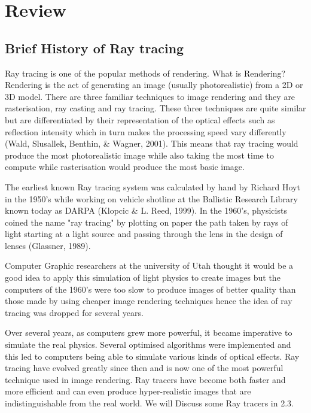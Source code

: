 \documentclass[a4paper]{article}
\begin{document}
	\section{Review}
	\subsection{Brief History of Ray tracing}
	
	\par Ray tracing is one of the popular methods of rendering. What is Rendering? Rendering is the act of generating an image (usually photorealistic) from a 2D or 3D model. There are three familiar techniques to image rendering and they are rasterisation, ray casting and ray tracing. These three techniques are quite similar but are differentiated by their representation of the optical effects such as reflection intensity which in turn makes the processing speed vary differently (Wald, Slusallek, Benthin, \& Wagner, 2001). This means that ray tracing would produce the most photorealistic image while also taking the most time to compute while rasterisation would produce the most basic image.\\
	
	\par The earliest known Ray tracing system was calculated by hand by Richard Hoyt in the 1950's while working on vehicle shotline at the Ballistic Research Library known today as DARPA (Klopcic \& L. Reed, 1999). In the 1960's, physicists coined the name "ray tracing" by plotting on paper the path taken by rays of light starting at a light source and passing through the lens in the design of lenses (Glassner, 1989).\\
	
	\par Computer Graphic researchers at the university of Utah thought it would be a good idea to apply this simulation of light physics to create images but the computers of the 1960's were too slow to produce images of better quality than those made by using cheaper image rendering techniques hence the idea of ray tracing was dropped for several years.\\
	
	\par Over several years, as computers grew more powerful, it became imperative to simulate the real physics. Several optimised algorithms were implemented and this led to computers being able to simulate various kinds of optical effects. Ray tracing have evolved greatly since then and is now one of the most powerful technique used in image rendering. Ray tracers have become both faster and more efficient and can even produce hyper-realistic images that are indistinguishable from the real world. We will Discuss some Ray tracers in 2.3.\\
	
\end{document}
